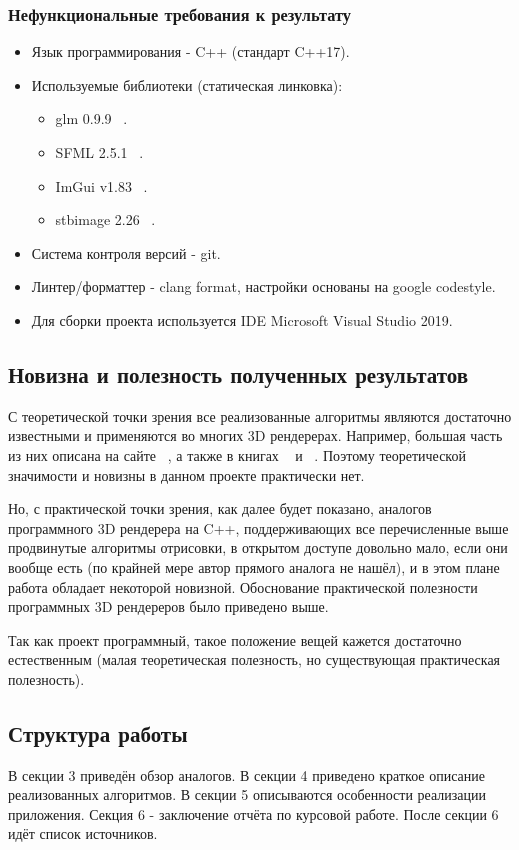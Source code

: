 \documentclass[14pt]{extarticle}
\begin{document}
\subsubsection{Нефункциональные требования к результату}
\begin{itemize}
	\item Язык программирования - C++ (стандарт C++17).
	\item Используемые библиотеки (статическая линковка):
	\begin{itemize}
		\item glm 0.9.9 ~\cite{glm}.
		\item SFML 2.5.1 ~\cite{sfml}.
		\item ImGui v1.83 ~\cite{imgui}.
		\item stb\textunderscore image 2.26 ~\cite{stb}.
	\end{itemize}
	\item Система контроля версий - git.
	\item Линтер/форматтер - clang format, настройки основаны на google codestyle.
	\item Для сборки проекта используется IDE Microsoft Visual Studio 2019.
\end{itemize}

\subsection{Новизна и полезность полученных результатов}
С теоретической точки зрения все реализованные алгоритмы являются достаточно известными и применяются во многих 3D рендерерах. Например, большая часть из них описана на сайте ~\cite{learnopengl}, а также в книгах ~\cite{LRN} и ~\cite{Math3d}. Поэтому теоретической значимости и новизны в данном проекте практически нет.

Но, с практической точки зрения, как далее будет показано, аналогов программного 3D рендерера на C++, поддерживающих все перечисленные выше продвинутые алгоритмы отрисовки, в открытом доступе довольно мало, если они вообще есть (по крайней мере автор прямого аналога не нашёл), и в этом плане работа обладает некоторой новизной. Обоснование практической полезности программных 3D рендереров было приведено выше.

Так как проект программный, такое положение вещей кажется достаточно естественным (малая теоретическая полезность, но существующая практическая полезность).

\subsection{Структура работы}
В секции 3 приведён обзор аналогов.
В секции 4 приведено краткое описание реализованных алгоритмов.
В секции 5 описываются особенности реализации приложения.
Секция 6 - заключение отчёта по курсовой работе.
После секции 6 идёт список источников.
\end{document}
